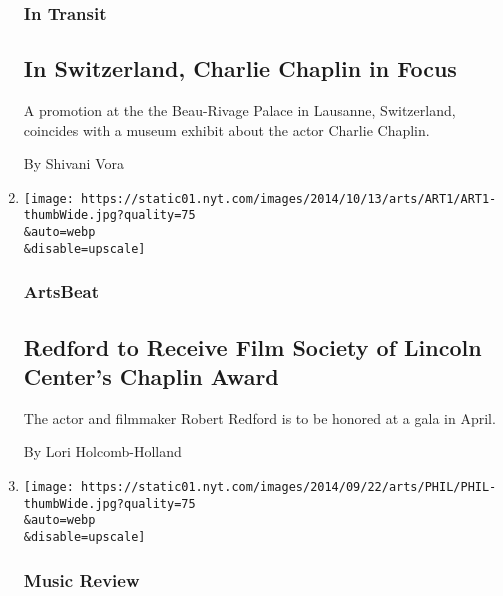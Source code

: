 \begin{enumerate}
  \hypertarget{in-transit}{%
  \subsubsection{In Transit}\label{in-transit}}

  \hypertarget{in-switzerland-charlie-chaplin-in-focus}{%
  \subsection{In Switzerland, Charlie Chaplin in
  Focus}\label{in-switzerland-charlie-chaplin-in-focus}}

  A promotion at the the Beau-Rivage Palace in Lausanne, Switzerland,
  coincides with a museum exhibit about the actor Charlie Chaplin.

  By Shivani Vora
\item
  \href{https://artsbeat.blogs.nytimes.com/2014/10/12/redford-to-receive-film-society-of-lincoln-centers-chaplin-award/}{}

  \texttt{[image: https://static01.nyt.com/images/2014/10/13/arts/ART1/ART1-thumbWide.jpg?quality=75\\\&auto=webp\\\&disable=upscale]}

  \hypertarget{artsbeat}{%
  \subsubsection{ArtsBeat}\label{artsbeat}}

  \hypertarget{redford-to-receive-film-society-of-lincoln-centers-chaplin-award}{%
  \subsection{Redford to Receive Film Society of Lincoln Center's
  Chaplin
  Award}\label{redford-to-receive-film-society-of-lincoln-centers-chaplin-award}}

  The actor and filmmaker Robert Redford is to be honored at a gala in
  April.

  By Lori Holcomb-Holland
\item
  \href{/2014/09/22/arts/music/philharmonic-plays-score-at-screening-of-modern-times.html}{}

  \texttt{[image: https://static01.nyt.com/images/2014/09/22/arts/PHIL/PHIL-thumbWide.jpg?quality=75\\\&auto=webp\\\&disable=upscale]}

  \hypertarget{music-review}{%
  \subsubsection{Music Review}\label{music-review}}


\end{enumerate}
